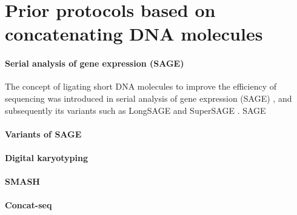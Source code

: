 \section{Prior protocols based on concatenating DNA molecules}
\paragraph{Serial analysis of gene expression (SAGE)}
The concept of ligating short DNA molecules to improve the efficiency
of sequencing was introduced in serial analysis of gene expression
(SAGE) \citep{}, and subsequently its variants such as LongSAGE and
SuperSAGE \citep{}. SAGE

\paragraph{Variants of SAGE}

\paragraph{Digital karyotyping}

\paragraph{SMASH}

\paragraph{Concat-seq}

